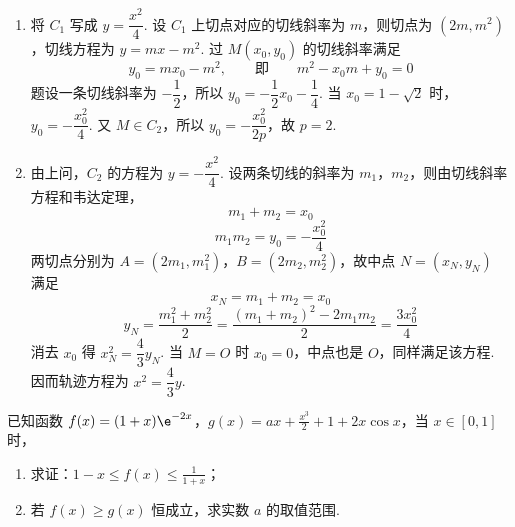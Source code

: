 \begin{solution}
\begin{enumerate}
\item 将 \(C_1\) 写成 \(y=\dfrac{x^2}{4}\). 设 \(C_1\) 上切点对应的切线斜率为 \(m\)，则切点为 \((2m,m^2)\)，切线方程为 \(y=mx-m^2\). 过 \(M(x_0,y_0)\) 的切线斜率满足
\[
y_0=mx_0-m^2,\qquad\text{即}\qquad m^2-x_0m+y_0=0
\]
题设一条切线斜率为 \(-\dfrac12\)，所以 \(y_0=-\dfrac12x_0-\dfrac14\). 当 \(x_0=1-\sqrt2\) 时，\(y_0=-\dfrac{x_0^2}{4}\). 又 \(M\in C_2\)，所以 \(y_0=-\dfrac{x_0^2}{2p}\)，故 \(p=2\).

\item 由上问，\(C_2\) 的方程为 \(y=-\dfrac{x^2}{4}\). 设两条切线的斜率为 \(m_1\)，\(m_2\)，则由切线斜率方程和韦达定理，
\[
m_1+m_2=x_0
\]
\[
m_1m_2=y_0=-\frac{x_0^2}{4}
\]
两切点分别为 \(A=(2m_1,m_1^2)\)，\(B=(2m_2,m_2^2)\)，故中点 \(N=(x_N,y_N)\) 满足
\[
x_N=m_1+m_2=x_0
\]
\[
y_N=\frac{m_1^2+m_2^2}{2}=\frac{(m_1+m_2)^2-2m_1m_2}{2}=\frac{3x_0^2}{4}
\]
消去 \(x_0\) 得 \(x_N^2=\dfrac43y_N\). 当 \(M=O\) 时 \(x_0=0\)，中点也是 \(O\)，同样满足该方程. 因而轨迹方程为 \(x^2=\dfrac43y\).
\end{enumerate}
\end{solution}

\begin{problem}
已知函数 \(f(x) = (1 + x)\e^{-2x}\)，\(g(x) = ax + \frac{x^3}{2} + 1 + 2x\cos x\)，当 \(x \in [0,1]\) 时，

\begin{enumerate}
\item 求证：\(1 - x \leqslant f(x) \leqslant \frac{1}{1 + x}\)；
\item 若 \(f(x) \geqslant g(x)\) 恒成立，求实数 \(a\) 的取值范围.
\end{enumerate}
\end{problem}

